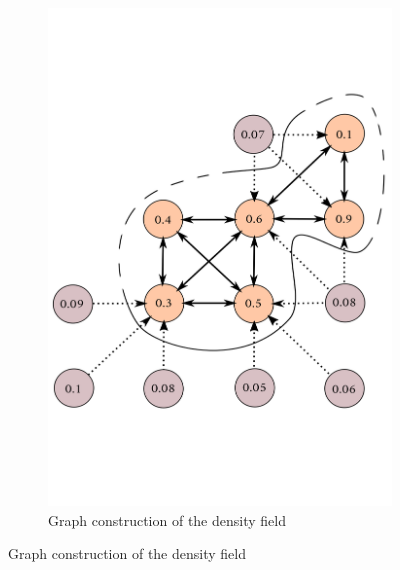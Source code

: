 \documentclass[11pt,a4paper]{report}
\begin{document}
\begin{multicols*}{2}
    \begin{figure}[H]
        \begin{subfigure}[b]{.48\linewidth}
            \includegraphics[width=\linewidth]{./figure/graph.png}
            \caption{Graph construction of the density field}


\end{subfigure}
\end{figure}
\end{multicols*}
\end{document}
